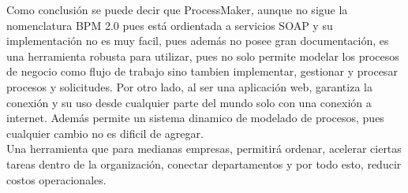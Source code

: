 Como conclusión se puede decir que ProcessMaker, aunque no sigue la nomenclatura BPM 2.0  pues está ordientada a servicios SOAP y su implementación no es muy facil, pues además no  posee gran documentación,  es una herramienta robusta para utilizar, pues no solo permite modelar los procesos de negocio como flujo de trabajo sino tambien implementar, gestionar y procesar procesos y solicitudes. Por otro lado, al ser una aplicación web, garantiza la conexión y su uso desde cualquier parte del mundo solo con  una conexión a internet. Además permite un sistema dinamico de modelado de procesos, pues cualquier cambio no es dificil de agregar.
\\
Una herramienta que para medianas empresas, permitirá ordenar,  acelerar ciertas tareas dentro de la organización, conectar departamentos y por todo esto, reducir costos operacionales.